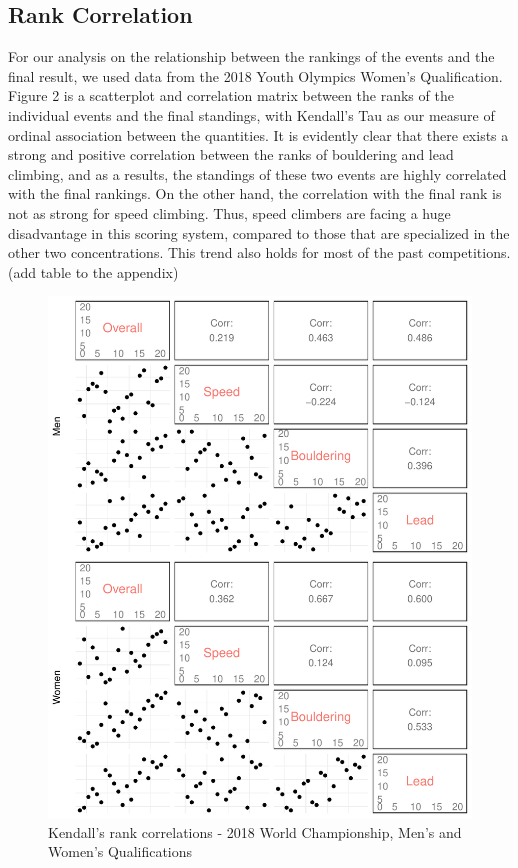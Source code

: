 \documentclass[12pt]{article}
\begin{document}
\hypertarget{rank-correlation}{%
\subsection{Rank Correlation}\label{rank-correlation}}

For our analysis on the relationship between the rankings of the events
and the final result, we used data from the 2018 Youth Olympics Women's
Qualification. Figure 2 is a scatterplot and correlation matrix between
the ranks of the individual events and the final standings, with
Kendall's Tau \citep{kendall1938} as our measure of ordinal association
between the quantities. It is evidently clear that there exists a strong
and positive correlation between the ranks of bouldering and lead
climbing, and as a results, the standings of these two events are highly
correlated with the final rankings. On the other hand, the correlation
with the final rank is not as strong for speed climbing. Thus, speed
climbers are facing a huge disadvantage in this scoring system, compared
to those that are specialized in the other two concentrations. This
trend also holds for most of the past competitions. (add table to the
appendix)

\begin{figure}
\centering
\includegraphics{draft_files/figure-latex/unnamed-chunk-9-1.pdf}
\caption{Kendall's rank correlations - 2018 World Championship, Men's
and Women's Qualifications}
\end{figure}
\end{document}
